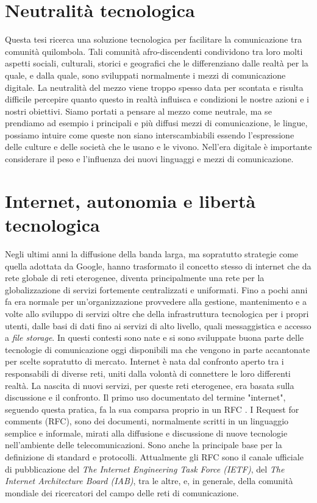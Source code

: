 \section{Neutralità tecnologica}
Questa tesi ricerca una soluzione tecnologica per facilitare la
comunicazione tra comunità quilombola. Tali comunità
afro-discendenti condividono tra loro molti aspetti sociali,
culturali, storici e geografici che le differenziano dalle realtà per
la quale, e dalla quale, sono sviluppati normalmente i mezzi di
comunicazione digitale. La neutralità del mezzo viene troppo spesso
data per scontata e risulta difficile percepire quanto questo in
realtà influisca e condizioni le nostre azioni e i nostri
obiettivi. Siamo portati a pensare al mezzo come neutrale, ma se
prendiamo ad esempio i principali e più diffusi mezzi di
comunicazione, le lingue, possiamo intuire come queste non siano
interscambiabili essendo l'espressione delle culture e delle società
che le usano e le vivono. Nell'era digitale è importante considerare
il peso e l'influenza dei nuovi linguaggi e mezzi di comunicazione.

\section{Internet, autonomia e libertà tecnologica}
Negli ultimi anni la diffusione della banda larga, ma sopratutto
strategie come quella adottata da Google, hanno trasformato il
concetto stesso di internet che da rete globale di reti eterogenee,
diventa principalmente una rete per la globalizzazione di servizi
fortemente centralizzati e uniformati. Fino a pochi anni fa era
normale per un'organizzazione provvedere alla gestione, mantenimento e
a volte allo sviluppo di servizi oltre che della infrastruttura
tecnologica per i propri utenti, dalle basi di dati fino ai servizi di
alto livello, quali messaggistica e accesso a \emph{file storage}. In
questi contesti sono nate e si sono sviluppate buona parte delle
tecnologie di comunicazione oggi disponibili ma che vengono in parte
accantonate per scelte sopratutto di mercato. Internet è nata dal
confronto aperto tra i responsabili di diverse reti, uniti dalla
volontà di connettere le loro differenti realtà. La nascita di nuovi
servizi, per queste reti eterogenee, era basata sulla discussione e il
confronto. Il primo uso documentato del termine "internet", seguendo
questa pratica, fa la sua comparsa proprio in un RFC \citep{RFC675}. I
Request for comments (RFC), sono dei documenti, normalmente scritti in
un linguaggio semplice e informale, mirati alla diffusione e
discussione di nuove tecnologie nell'ambiente delle
telecomunicazioni. Sono anche la principale base per la definizione di
standard e protocolli. Attualmente gli RFC sono il canale ufficiale di
pubblicazione del \emph{The Internet Engineering Task Force (IETF)},
del \emph{The Internet Architecture Board (IAB)}, tra le altre, e, in
generale, della comunità mondiale dei ricercatori del campo delle reti
di comunicazione.

